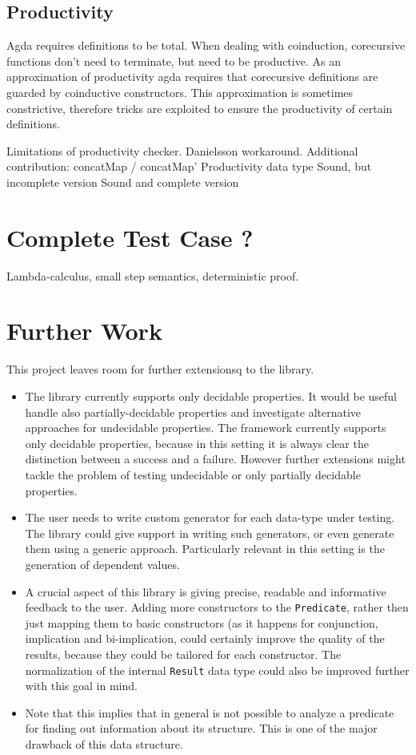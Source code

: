 \documentclass[10pt,a4paper]{article}
\begin{document}
\subsection{Productivity}
\label{sec:Productivity}
Agda requires definitions to be total. When dealing with coinduction, corecursive functions don't need to terminate, but need to be productive.
As an approximation of productivity agda requires that corecursive definitions are guarded by coinductive constructors. This approximation is sometimes constrictive, therefore tricks are exploited to ensure the productivity of certain definitions.

Limitations of productivity checker.
Danielsson workaround.
Additional contribution:
	concatMap / concatMap'
Productivity data type
	Sound, but incomplete version
	Sound and complete version
		
\section{Complete Test Case ?}
Lambda-calculus, small step semantics, deterministic proof.

\section{Further Work}
This project leaves room for further extensionsq to the library.
\begin{itemize}
	\item The library currently supports only decidable properties. It would be useful handle also partially-decidable properties and investigate alternative approaches for undecidable properties.
The framework currently supports only decidable properties, because in this setting it is always clear the distinction between a success and a failure.
However further extensions might tackle the problem of testing undecidable or only partially decidable properties.

	
	
	\item The user needs to write custom generator for each data-type under testing. The library could give support in writing such generators, or even generate them using a generic approach. Particularly relevant in this setting is the generation of dependent values.
	\item A crucial aspect of this library is giving precise, readable and informative feedback to the user. Adding more constructors to the \texttt{Predicate}, rather then just mapping them to basic constructors (as it happens for conjunction, implication and bi-implication, could certainly improve the quality of the results, because they could be tailored for each constructor. The normalization of the internal \texttt{Result} data type could also be improved further with this goal in mind.
\item Note that this implies that in general is not possible to analyze a predicate for finding out information about its structure. This is one of the major drawback of this data structure.

\end{itemize}
\end{document}
